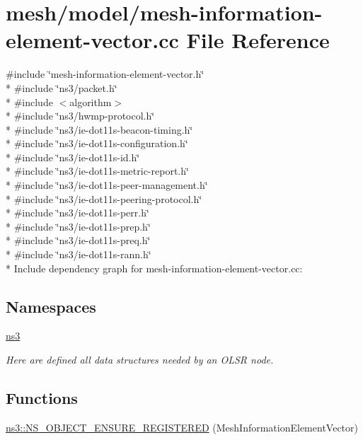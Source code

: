 \hypertarget{mesh-information-element-vector_8cc}{}\section{mesh/model/mesh-\/information-\/element-\/vector.cc File Reference}
\label{mesh-information-element-vector_8cc}
{\ttfamily \#include \char`\"{}mesh-\/information-\/element-\/vector.\+h\char`\"{}}\\*
{\ttfamily \#include \char`\"{}ns3/packet.\+h\char`\"{}}\\*
{\ttfamily \#include $<$algorithm$>$}\\*
{\ttfamily \#include \char`\"{}ns3/hwmp-\/protocol.\+h\char`\"{}}\\*
{\ttfamily \#include \char`\"{}ns3/ie-\/dot11s-\/beacon-\/timing.\+h\char`\"{}}\\*
{\ttfamily \#include \char`\"{}ns3/ie-\/dot11s-\/configuration.\+h\char`\"{}}\\*
{\ttfamily \#include \char`\"{}ns3/ie-\/dot11s-\/id.\+h\char`\"{}}\\*
{\ttfamily \#include \char`\"{}ns3/ie-\/dot11s-\/metric-\/report.\+h\char`\"{}}\\*
{\ttfamily \#include \char`\"{}ns3/ie-\/dot11s-\/peer-\/management.\+h\char`\"{}}\\*
{\ttfamily \#include \char`\"{}ns3/ie-\/dot11s-\/peering-\/protocol.\+h\char`\"{}}\\*
{\ttfamily \#include \char`\"{}ns3/ie-\/dot11s-\/perr.\+h\char`\"{}}\\*
{\ttfamily \#include \char`\"{}ns3/ie-\/dot11s-\/prep.\+h\char`\"{}}\\*
{\ttfamily \#include \char`\"{}ns3/ie-\/dot11s-\/preq.\+h\char`\"{}}\\*
{\ttfamily \#include \char`\"{}ns3/ie-\/dot11s-\/rann.\+h\char`\"{}}\\*
Include dependency graph for mesh-\/information-\/element-\/vector.cc\+:
\subsection*{Namespaces}
\begin{DoxyCompactItemize}
\item 
 \hyperlink{namespacens3}{ns3}
\begin{DoxyCompactList}\small\item\em Here are defined all data structures needed by an O\+L\+SR node. \end{DoxyCompactList}\end{DoxyCompactItemize}
\subsection*{Functions}
\begin{DoxyCompactItemize}
\item 
\hyperlink{namespacens3_af4ad35225ba53871bf260d9e588cd913}{ns3\+::\+N\+S\+\_\+\+O\+B\+J\+E\+C\+T\+\_\+\+E\+N\+S\+U\+R\+E\+\_\+\+R\+E\+G\+I\+S\+T\+E\+R\+ED} (Mesh\+Information\+Element\+Vector)
\end{DoxyCompactItemize}

